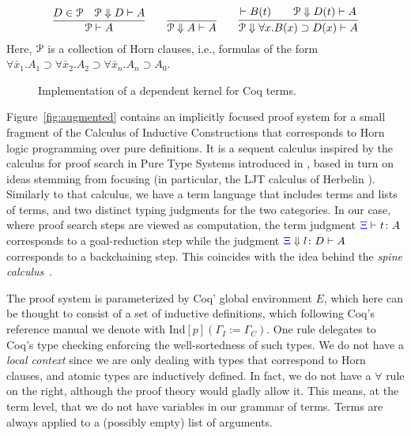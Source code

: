 \[
  \infer{\Pscr\vdash A}{D \in \Pscr\quad \Pscr\Downarrow D\vdash A}
  \qquad
  \infer{\Pscr\Downarrow A\vdash A}{}
  \qquad
  \infer{\Pscr\Downarrow\forall x. B(x)\supset D(x)\vdash A}
        {\vdash B(t)\qquad \Pscr\Downarrow D(t)\vdash A}
\]
Here, ${\mathcal P}$ is a collection of Horn clauses, i.e., formulas of the
form $\forall \bar x_1. A_1\supset \forall \bar x_2. A_2\supset
\forall \bar x_n. A_n\supset A_0$. 

\begin{figure}


\caption{Implementation of a  dependent kernel for Coq terms.}
\label{fig:kernel}
\end{figure}


Figure~\ref{fig:augmented} contains an implicitly focused proof system  for a small fragment of the Calculus of Inductive Constructions that corresponds to Horn logic programming over pure  definitions.
%
It is a sequent calculus inspired by the calculus for
proof search in Pure Type Systems introduced in \cite{LengrandDM06}, based in
 turn on ideas stemming from focusing (in particular, the LJT calculus of
Herbelin \cite{Herbelin94}). Similarly to that calculus, we have a term
language that includes terms and lists of terms, and two distinct typing
judgments for the two categories. In our case, where proof search steps are
viewed as computation, the term judgment ${\color{blue}{\Xi}}\vdash t \colon A$ corresponds to a goal-reduction
step while the judgment ${\color{blue}{\Xi}} \Downarrow  l \colon D\vdash A$ corresponds to a backchaining step. This coincides
with the idea behind the \emph{spine calculus}~\cite{Cervesato97tr}.


The proof system is parameterized by Coq' global environment $E$, which
here can be thought to consist of a set of inductive definitions,
which following Coq's reference manual we denote with
$\mathrm{Ind}[p]  (\Gamma_I := \Gamma_C)$.  One  rule delegates
to Coq's type checking enforcing the well-sortedness of such types. We
do not have a \emph{local context} since we are only dealing with types
that correspond to Horn clauses, and atomic types are inductively
defined. In fact, we do not have a $\forall$ rule on the right,
although the proof theory would gladly allow it. This means, at the
term level, that we do not have variables in our grammar of
terms. Terms are always applied to a (possibly empty) list of
arguments.

